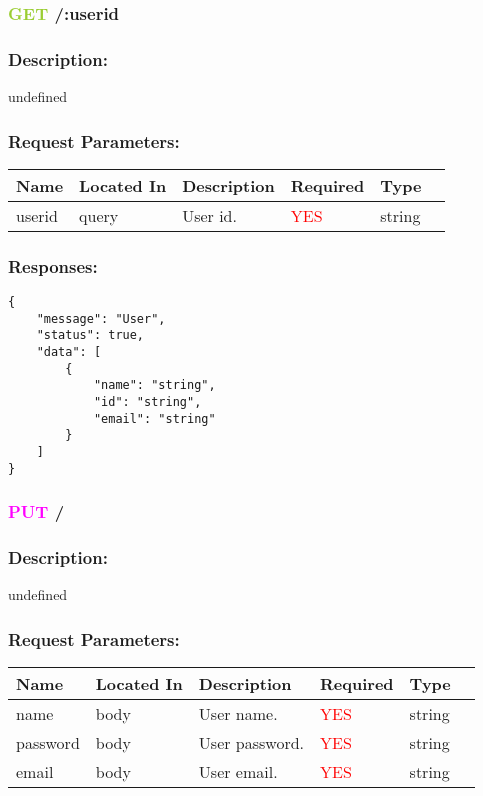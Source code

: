 \documentclass{article}
\begin{document}
\subsubsection*{\textcolor{YellowGreen}{GET} /:userid}
\subsubsection{Description:} 
undefined
 \subsubsection{Request Parameters:} 
 
\begin{tabular}{ | l | l | l | l | l | p{5cm} |} 
 \hline 
\textbf{Name} & \textbf{Located In} & \textbf{Description} & \textbf{Required} & \textbf{Type}\\ \hline 
userid & query & User id. & \textcolor{red}{YES} & string\\ \hline 
\end{tabular} 
 
\subsubsection{Responses:}
  
\begin{lstlisting}[frame=single, title=\textbf{200}] 
{
    "message": "User",
    "status": true,
    "data": [
        {
            "name": "string",
            "id": "string",
            "email": "string"
        }
    ]
}
\end{lstlisting}
  
\subsubsection*{\textcolor{magenta}{PUT} /}
\subsubsection{Description:} 
undefined
 \subsubsection{Request Parameters:} 
 
\begin{tabular}{ | l | l | l | l | l | p{5cm} |} 
 \hline 
\textbf{Name} & \textbf{Located In} & \textbf{Description} & \textbf{Required} & \textbf{Type}\\ \hline 
name & body & User name. & \textcolor{red}{YES} & string\\ \hline 
password & body & User password. & \textcolor{red}{YES} & string\\ \hline 
email & body & User email. & \textcolor{red}{YES} & string\\ \hline 
\end{tabular} 
 
\end{document}
